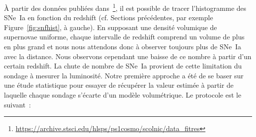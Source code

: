 \documentclass[../main/main.tex]{subfiles}
\begin{document}
À partir des données publiées dans~\cite{scolnic2018}\footnote{\href{
    https://archive.stsci.edu/hlsps/ps1cosmo/scolnic/data_fitres/}
{https://archive.stsci.edu/hlsps/ps1cosmo/scolnic/data\_fitres}}, il est
possible de tracer l'histogramme des SNe~Ia en fonction du redshift (cf.
Sections précédentes, par exemple Figure~\ref{fig:snfhist}, à gauche). En
supposant une densité volumique de supernovae uniforme, chaque intervalle de
redshift comprend un volume de plus en plus grand et nous nous attendons donc à
observer toujours plus de SNe~Ia avec la distance. Nous observons cependant une
baisse de ce nombre à partir d'un certain redshift. La chute de nombre de SNe~Ia
provient de cette limitation du sondage à mesurer la luminosité. Notre première
approche a été de se baser sur une étude statistique pour essayer de récupérer
la valeur estimée à partir de laquelle chaque sondage s'écarte d'un modèle
volumétrique. Le protocole est le suivant~:
\end{document}
